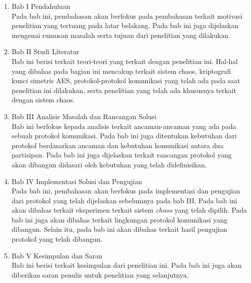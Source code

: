 \begin{enumerate}
  \item Bab I Pendahuluan\\
  Pada bab ini, pembahasan akan berfokus pada pembahasan terkait motivasi penelitian yang tertuang pada latar belakang. Pada bab ini juga dijelaskan mengenai rumusan masalah serta tujuan dari penelitian yang dilakukan.

  \item Bab II Studi Literatur\\
  Bab ini berisi terkait teori-teori yang terkait dengan penelitian ini. Hal-hal yang dibahas pada bagian ini mencakup terkait sistem chaos, kriptografi kunci simetris AES, protokol-protokol komunikasi yang telah ada pada saat penelitian ini dilakukan, serta penelitian yang telah ada khususnya terkait dengan sistem chaos.

  \item Bab III Analisis Masalah dan Rancangan Solusi\\
  Bab ini berfokus kepada analisis terkait ancaman-ancaman yang ada pada sebuah protokol komunikasi. Pada bab ini juga ditentukan kebutuhan dari protokol berdasarkan ancaman dan kebutuhan komunikasi antara dua partisipan. Pada bab ini juga dijelaskan terkait rancangan protokol yang akan dibangun didasari oleh kebutuhan yang telah didefinisikan.

  \item Bab IV Implementasi Solusi dan Pengujian\\
  Pada bab ini, pembahasan akan berfokus pada implementasi dan pengujian dari protokol yang telah dijelaskan sebelumnya pada bab III. Pada bab ini akan dibahas terkait eksperimen terkait sistem \emph{chaos} yang telah dipilih. Pada bab ini juga akan dibahas terkait lingkungan protokol komunikasi yang dibangun. Selain itu, pada bab ini akan dibahas terkait hasil pengujian protokol yang telah dibangun.

  \item Bab V Kesimpulan dan Saran\\
  Bab ini berisi terkait kesimpulan dari penelitian ini. Pada bab ini juga akan diberikan saran penulis untuk penelitian yang selanjutnya.

\end{enumerate}
